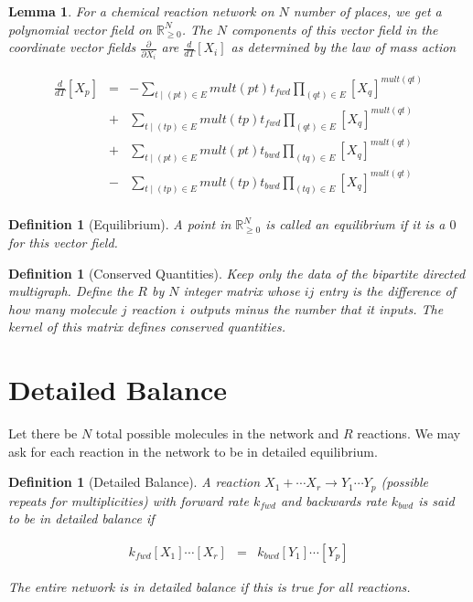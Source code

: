 \documentclass[11pt]{book}
\theoremstyle{change}
\newtheorem{definition}[equation]{Definition}
\newtheorem{lemma}[equation]{Lemma}
\theoremstyle{nonumberplain}
\numberwithin{equation}{section}
\begin{document}
\begin{lemma}
For a chemical reaction network on $N$ number of places, we get a polynomial vector field on $\mathbb{R}_{\geq 0}^N$. The $N$ components of this vector field in the coordinate vector fields $\frac{\partial}{\partial X_i}$ are $\frac{d}{dT} [X_i]$ as determined by the law of mass action

\begin{eqnarray*}
\frac{d}{dT} [X_p] &=& - \sum_{t \mid (pt) \in E}  mult(pt) t_{fwd} \prod_{(qt) \in E} [X_q]^{mult(qt)}\\
&+& \sum_{t \mid (tp) \in E} mult(tp) t_{fwd} \prod_{(qt) \in E} [X_q]^{mult(qt)}\\
&+& \sum_{t \mid (pt) \in E} mult(pt) t_{bwd} \prod_{(tq) \in E} [X_q]^{mult(qt)}\\
&-& \sum_{t \mid (tp) \in E} mult(tp) t_{bwd} \prod_{(tq) \in E} [X_q]^{mult(qt)}\\
\end{eqnarray*}

\end{lemma}

\begin{definition}[Equilibrium]
A point in $\mathbb{R}_{\geq 0}^N$ is called an equilibrium if it is a $0$ for this vector field.
\end{definition}

\begin{definition}[Conserved Quantities]
Keep only the data of the bipartite directed multigraph. Define the $R$ by $N$ integer matrix whose $ij$ entry is the difference of how many molecule $j$ reaction $i$ outputs minus the number that it inputs. The kernel of this matrix defines conserved quantities.
\end{definition}

\section{Detailed Balance}

Let there be $N$ total possible molecules in the network and $R$ reactions. We may ask for each reaction in the network to be in detailed equilibrium.

\begin{definition}[Detailed Balance]

A reaction $X_1 + \cdots X_r \to Y_1 \cdots Y_p$ (possible repeats for multiplicities) with forward rate $k_{fwd}$ and backwards rate $k_{bwd}$ is said to be in detailed balance if

\begin{eqnarray*}
k_{fwd} [X_1] \cdots [X_r] &=& k_{bwd} [Y_1] \cdots [Y_p]
\end{eqnarray*}

The entire network is in detailed balance if this is true for all reactions.
\end{definition}
\end{document}
